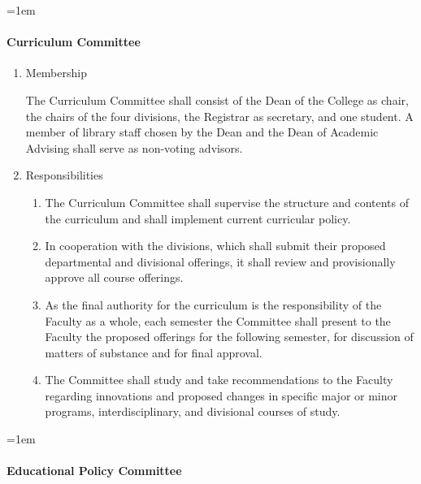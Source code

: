 \documentclass{manual}
\let\oldparagraph\paragraph
\renewcommand\paragraph{\leftskip=1em\oldparagraph}
\newcommand{\itemLevelA}{\alph*.}
\newcommand{\itemLevelB}{\arabic*)}
\newcommand{\itemRefA}{\alph*}
\newcommand{\itemRefB}{\arabic*}
\begin{document}
\paragraph{Curriculum Committee}

\begin{enumerate}[label=\itemLevelA,ref=\itemRefA]
\item Membership

The Curriculum Committee shall consist of the Dean of the College as chair, the chairs of the four divisions, the Registrar as secretary, and one student. A member of library staff chosen by the Dean and the Dean of Academic Advising shall serve as non-voting advisors.

\item Responsibilities
\begin{enumerate}[label=\itemLevelB,ref=\itemRefB]
\item The Curriculum Committee shall supervise the structure and contents of the curriculum and shall implement current curricular policy.
\item In cooperation with the divisions, which shall submit their proposed departmental and divisional offerings, it shall review and provisionally approve all course offerings.
\item As the final authority for the curriculum is the responsibility of the Faculty as a whole, each semester the Committee shall present to the Faculty the proposed offerings for the following semester, for discussion of matters of substance and for final approval.
\item The Committee shall study and take recommendations to the Faculty regarding innovations and proposed changes in specific major or minor programs, interdisciplinary, and divisional courses of study.

\end{enumerate}
\end{enumerate}

\paragraph{Educational Policy Committee}
\end{document}
